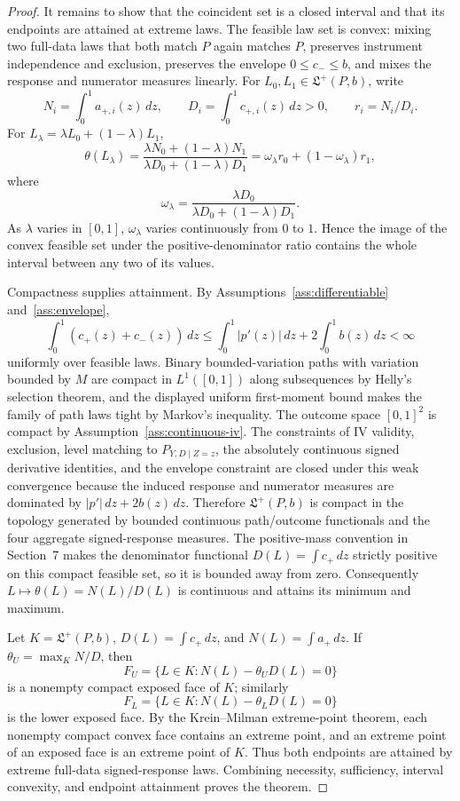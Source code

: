 \begin{proof}
It remains to show that the coincident set is a closed interval and that its
endpoints are attained at extreme laws.  The feasible law set is convex:
mixing two full-data laws that both match \(P\) again matches \(P\), preserves
instrument independence and exclusion, preserves the envelope
\(0\le c_-\le b\), and mixes the response and numerator measures linearly.
For \(L_0,L_1\in\mathfrak L^+(P,b)\), write
\[
N_i=\int_0^1 a_{+,i}(z)\,dz,\qquad
D_i=\int_0^1 c_{+,i}(z)\,dz>0,\qquad
r_i=N_i/D_i .
\]
For \(L_\lambda=\lambda L_0+(1-\lambda)L_1\),
\[
\theta(L_\lambda)=
\frac{\lambda N_0+(1-\lambda)N_1}
     {\lambda D_0+(1-\lambda)D_1}
=
\omega_\lambda r_0+(1-\omega_\lambda)r_1,
\]
where
\[
\omega_\lambda=
\frac{\lambda D_0}{\lambda D_0+(1-\lambda)D_1}.
\]
As \(\lambda\) varies in \([0,1]\), \(\omega_\lambda\) varies continuously
from \(0\) to \(1\).  Hence the image of the convex feasible set under the
positive-denominator ratio contains the whole interval between any two of its
values.

Compactness supplies attainment.  By Assumptions~\ref{ass:differentiable}
and~\ref{ass:envelope},
\[
\int_0^1(c_+(z)+c_-(z))\,dz
\le
\int_0^1 |p'(z)|\,dz+2\int_0^1b(z)\,dz<\infty
\]
uniformly over feasible laws.  Binary bounded-variation paths with variation
bounded by \(M\) are compact in \(L^1([0,1])\) along subsequences by Helly's
selection theorem, and the displayed uniform first-moment bound makes the
family of path laws tight by Markov's inequality.  The outcome space
\([0,1]^2\) is compact by Assumption~\ref{ass:continuous-iv}.  The constraints
of IV validity, exclusion, level matching to \(P_{Y,D\mid Z=z}\), the
absolutely continuous signed derivative identities, and the envelope
constraint are closed under this weak convergence because the induced response
and numerator measures are dominated by
\(|p'|\,dz+2b(z)\,dz\).  Therefore \(\mathfrak L^+(P,b)\) is compact in the
topology generated by bounded continuous path/outcome functionals and the
four aggregate signed-response measures.  The positive-mass convention in
Section~7 makes the denominator functional \(D(L)=\int c_+\,dz\) strictly
positive on this compact feasible set, so it is bounded away from zero.
Consequently \(L\mapsto \theta(L)=N(L)/D(L)\) is continuous and attains its
minimum and maximum.

Let \(K=\mathfrak L^+(P,b)\), \(D(L)=\int c_+\,dz\), and
\(N(L)=\int a_+\,dz\).  If \(\theta_U=\max_K N/D\), then
\[
F_U=\{L\in K:N(L)-\theta_U D(L)=0\}
\]
is a nonempty compact exposed face of \(K\); similarly
\[
F_L=\{L\in K:N(L)-\theta_L D(L)=0\}
\]
is the lower exposed face.  By the Krein--Milman extreme-point theorem, each
nonempty compact convex face contains an extreme point, and an extreme point
of an exposed face is an extreme point of \(K\).  Thus both endpoints are
attained by extreme full-data signed-response laws.  Combining necessity,
sufficiency, interval convexity, and endpoint attainment proves the theorem.
\end{proof}

